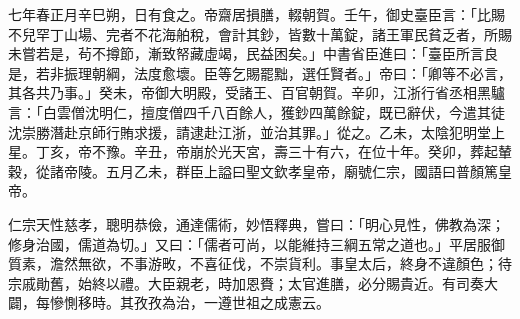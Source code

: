 \begin{pinyinscope}
 七年春正月辛巳朔，日有食之。帝齋居損膳，輟朝賀。壬午，御史臺臣言：「比賜不兒罕丁山場、完者不花海舶稅，會計其鈔，皆數十萬錠，諸王軍民貧乏者，所賜未嘗若是，茍不撙節，漸致帑藏虛竭，民益困矣。」中書省臣進曰：「臺臣所言良是，若非振理朝綱，法度愈壞。臣等乞賜罷黜，選任賢者。」帝曰：「卿等不必言，其各共乃事。」癸未，帝御大明殿，受諸王、百官朝賀。辛卯，江浙行省丞相黑驢言：「白雲僧沈明仁，擅度僧四千八百餘人，獲鈔四萬餘錠，既已辭伏，今遣其徒沈崇勝潛赴京師行賄求援，請逮赴江浙，並治其罪。」從之。乙未，太陰犯明堂上星。丁亥，帝不豫。辛丑，帝崩於光天宮，壽三十有六，在位十年。癸卯，葬起輦穀，從諸帝陵。五月乙未，群臣上謚曰聖文欽孝皇帝，廟號仁宗，國語曰普顏篤皇帝。



 仁宗天性慈孝，聰明恭儉，通達儒術，妙悟釋典，嘗曰：「明心見性，佛教為深；修身治國，儒道為切。」又曰：「儒者可尚，以能維持三綱五常之道也。」平居服御質素，澹然無欲，不事游畋，不喜征伐，不崇貨利。事皇太后，終身不違顏色；待宗戚勛舊，始終以禮。大臣親老，時加恩賚；太官進膳，必分賜貴近。有司奏大闢，每慘惻移時。其孜孜為治，一遵世祖之成憲云。



\end{pinyinscope}